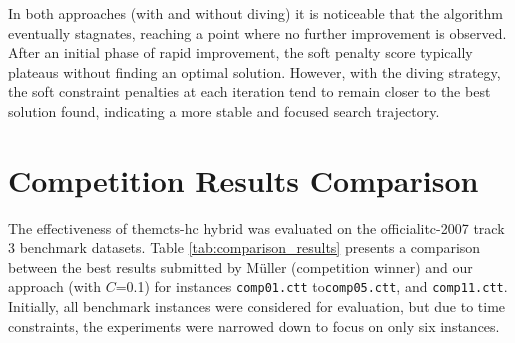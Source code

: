 In both approaches (with and without diving) it is noticeable that the algorithm eventually stagnates, reaching a point where no further improvement is observed. After an initial phase of rapid improvement, the soft penalty score typically plateaus without finding an optimal solution. However, with the diving strategy, the soft constraint penalties at each iteration tend to remain closer to the best solution found, indicating a more stable and focused search trajectory.

\section{Competition Results Comparison}

The effectiveness of the\ac{mcts}-\ac{hc} hybrid was evaluated on the official\ac{itc-2007} track 3 benchmark datasets. Table \ref{tab:comparison_results} presents a comparison between the best results submitted by Müller (competition winner) and our approach (with \(C\)=0.1) for instances \texttt{comp01.ctt} to\texttt{comp05.ctt}, and \texttt{comp11.ctt}. Initially, all benchmark instances were considered for evaluation, but due to time constraints, the experiments were narrowed down to focus on only six instances.

